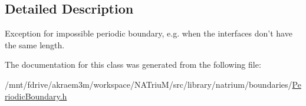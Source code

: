 \subsection{Detailed Description}
Exception for impossible periodic boundary, e.g. when the interfaces don't have the same length. 

The documentation for this class was generated from the following file:\begin{DoxyCompactItemize}
\item 
/mnt/fdrive/akraem3m/workspace/NATriuM/src/library/natrium/boundaries/\hyperlink{PeriodicBoundary_8h}{PeriodicBoundary.h}\end{DoxyCompactItemize}
